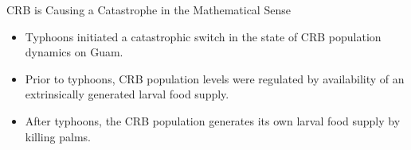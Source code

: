 \documentclass[]{beamer}
\begin{document}
\begin{frame}{CRB is Causing a Catastrophe in the Mathematical Sense}

	\begin{itemize}
		\item Typhoons initiated a catastrophic switch in the state of CRB population dynamics on Guam.
		\item Prior to typhoons, CRB population levels were regulated by availability of an extrinsically generated larval food supply.
		\item After typhoons, the CRB population generates its own larval food supply by killing palms.
	\end{itemize}
\end{frame}
\end{document}
